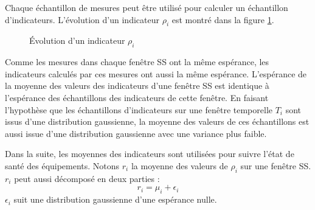 \documentclass{article}
\begin{document}
Chaque échantillon de mesures peut être utilisé pour calculer un échantillon d'indicateurs.
L'évolution d'un indicateur $\rho_i$ est montré dans la figure \ref{fig:exampleindicator}.

\begin{figure}[H]
\centering
{}
\caption{Évolution d'un indicateur $\rho_i$}
\label{fig:exampleindicator}
\end{figure}

Comme les mesures dans chaque fenêtre SS ont la même espérance, les indicateurs calculés par ces mesures ont aussi la même espérance.
L'espérance de la moyenne des valeurs des indicateurs d'une fenêtre SS est identique à l'espérance des échantillons des indicateurs de cette fenêtre. 
En faisant l'hypothèse que les échantillons d'indicateurs sur une fenêtre temporelle $T_i$  sont issus d'une distribution gaussienne, la moyenne des valeurs de ces échantillons est aussi issue d'une distribution gaussienne avec une variance plus faible.
 
Dans la suite, les moyennes des indicateurs sont utilisées pour suivre l'état de santé des équipements. 
Notons $r_i$ la moyenne des valeurs de $\rho_i$ sur une fenêtre SS.
$r_i$ peut aussi décomposé en deux parties : 
\begin{equation}
    r_i  = \mu_i + \epsilon_i
\end{equation}
$\epsilon_i$ suit une distribution gaussienne d'une espérance nulle.
\end{document}
